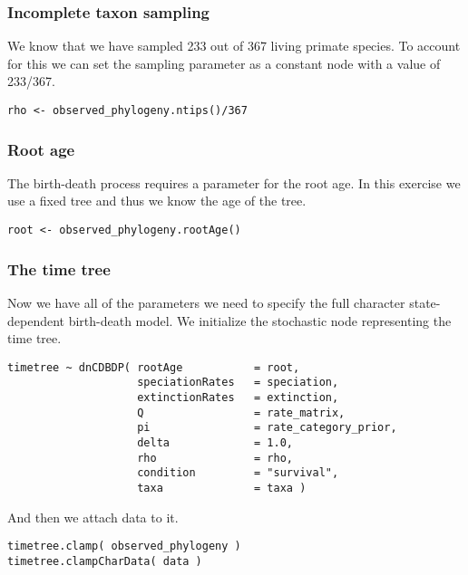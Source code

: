 \subsubsection{Incomplete taxon sampling}

We know that we have sampled 233 out of 367 living primate species. 
To account for this we can set the sampling parameter as a constant node with a value of 233/367.
{\tt \begin{snugshade*}
\begin{lstlisting}
rho <- observed_phylogeny.ntips()/367
\end{lstlisting}
\end{snugshade*}}


\subsubsection{Root age}

The birth-death process requires a parameter for the root age.
In this exercise we use a fixed tree and thus we know the age of the tree.
{\tt \begin{snugshade*}
\begin{lstlisting}
root <- observed_phylogeny.rootAge()
\end{lstlisting}
\end{snugshade*}}

\subsubsection{The time tree}

Now we have all of the parameters we need to specify the full character state-dependent birth-death model.
We initialize the stochastic node representing the time tree.
{\tt \begin{snugshade*}
\begin{lstlisting}
timetree ~ dnCDBDP( rootAge           = root,
                    speciationRates   = speciation,
                    extinctionRates   = extinction, 
                    Q                 = rate_matrix,
                    pi                = rate_category_prior,
                    delta             = 1.0,
                    rho               = rho,
                    condition         = "survival",
                    taxa              = taxa )
\end{lstlisting}
\end{snugshade*}}
And then we attach data to it.
{\tt \begin{snugshade*}
\begin{lstlisting}
timetree.clamp( observed_phylogeny )
timetree.clampCharData( data )
\end{lstlisting}
\end{snugshade*}}

